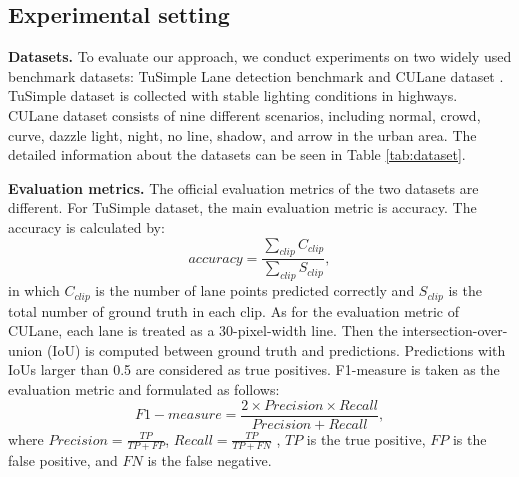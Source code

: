 \documentclass[runningheads]{llncs}
\begin{document}
\begin{table*}[]
	\centering
	\caption{Datasets description}
	\label{tab:dataset}
	\vspace{-10pt}
\end{table*}

\subsection{Experimental setting}
\label{sec_setting}

\noindent
\textbf{Datasets.} To evaluate our approach, we conduct experiments on two widely used benchmark datasets: TuSimple Lane detection benchmark \cite{tusimple} and CULane dataset \cite{SCNN}. TuSimple dataset is collected with stable lighting conditions in highways. CULane dataset consists of nine different scenarios, including normal, crowd, curve, dazzle light, night, no line, shadow, and arrow in the urban area. The detailed information about the datasets can be seen in Table \ref{tab:dataset}.

\noindent
\textbf{Evaluation metrics.} The official evaluation metrics of the two datasets are different. For TuSimple dataset, the main evaluation metric is accuracy. The accuracy is calculated by: 
\begin{equation}
accuracy = \dfrac{\sum_{clip}C_{clip}}{\sum_{clip}S_{clip}} ,
\end{equation}
in which $C_{clip}$ is the number of lane points predicted correctly and $S_{clip}$ is the total number of ground truth in each clip.
As for the evaluation metric of CULane, each lane is treated as a 30-pixel-width line. Then the intersection-over-union (IoU) is computed between ground truth and predictions. Predictions with IoUs larger than 0.5 are considered as true positives. F1-measure is taken as the evaluation metric and formulated as follows:
\begin{equation}
F1-measure = \frac{2 \times Precision \times Recall}{Precision + Recall},
\end{equation}
where $Precision = \frac{TP}{TP + FP}$, $Recall = \frac{TP}{TP + FN}$ , $TP$ is the true positive, $FP$ is the false positive, and $FN$ is the false negative.
\end{document}
